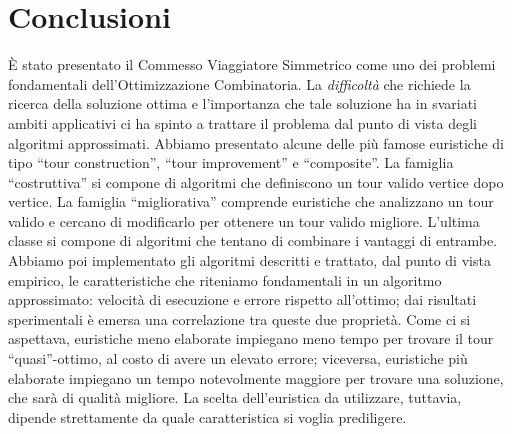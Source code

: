 \chapter{Conclusioni}

È stato presentato il Commesso Viaggiatore Simmetrico come uno dei problemi fondamentali 
dell'Ottimizzazione Combinatoria. La \textit{difficoltà} che richiede la ricerca della soluzione 
ottima e l'importanza che tale soluzione ha in svariati ambiti applicativi ci ha spinto 
a trattare il problema dal punto di vista degli algoritmi approssimati. Abbiamo presentato alcune 
delle più famose euristiche di tipo ``tour construction'', ``tour improvement'' e ``composite''. 
La famiglia ``costruttiva'' si compone di algoritmi che definiscono un tour valido vertice dopo vertice. 
La famiglia ``migliorativa'' comprende euristiche che analizzano un tour valido e cercano di modificarlo 
per ottenere un tour valido migliore. L'ultima classe si compone di algoritmi che tentano di combinare i 
vantaggi di entrambe. Abbiamo poi implementato gli algoritmi descritti e trattato, dal punto di vista empirico, 
le caratteristiche che riteniamo fondamentali in un algoritmo approssimato: velocità di esecuzione e 
errore rispetto all'ottimo; dai risultati sperimentali è emersa una correlazione tra queste due 
proprietà. Come ci si aspettava, euristiche meno elaborate impiegano meno tempo per trovare il tour 
``quasi''-ottimo, al costo di avere un elevato errore; viceversa, euristiche più elaborate impiegano 
un tempo notevolmente maggiore per trovare una soluzione, che sarà di qualità migliore. La scelta 
dell'euristica da utilizzare, tuttavia, dipende strettamente da quale caratteristica si voglia 
prediligere.